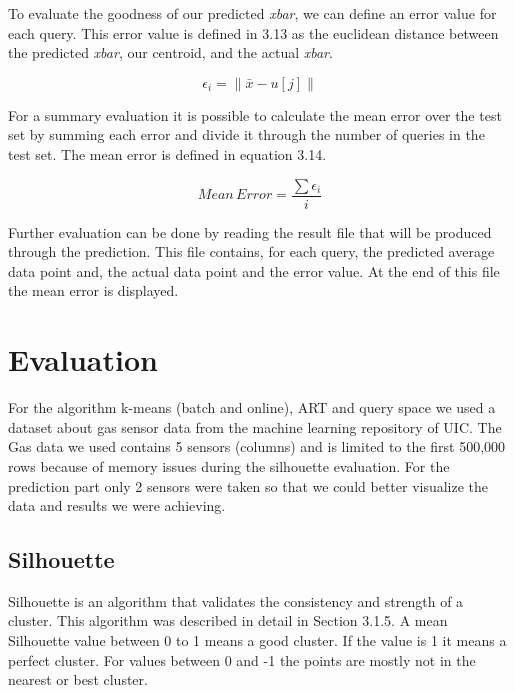\documentclass{lmproj}
\begin{document}
To evaluate the goodness of our predicted \textit{xbar}, we can define an error value for each query. This error value is defined in 3.13 as the euclidean distance between the predicted \textit{xbar}, our centroid, and the actual \textit{xbar}.

\begin{equation}
	\epsilon_i = \parallel \bar{x} - u[j] \parallel 
\end{equation}



For a summary evaluation it is possible to calculate the mean error over the test set by summing each error and divide it through the number of queries in the test set. The mean error is defined in equation 3.14.

\begin{equation}
Mean\,Error= \frac{\sum\epsilon_i}{i}
\end{equation}



Further evaluation can be done by reading the result file that will be produced through the prediction. This file contains, for each query, the predicted average data point and, the actual data point and the error value. At the end of this file the mean error is displayed. 
\chapter{Evaluation}
For the algorithm k-means (batch and online), ART and query space we used a dataset about gas sensor data from the machine learning repository of UIC\cite{dataArchive}. The Gas data we used contains 5 sensors (columns) and is limited to the first 500,000 rows because of memory issues during the silhouette evaluation. For the prediction part only 2 sensors were taken so that we could better visualize the data and results we were achieving.

\section{Silhouette}
Silhouette is an algorithm that validates the consistency and strength of a cluster. This algorithm was described in detail in Section 3.1.5.
A mean Silhouette value between 0 to 1 means a good cluster. If the value is 1 it means a perfect cluster. For values between 0 and -1 the points are mostly not in the nearest or best cluster.
\end{document}
